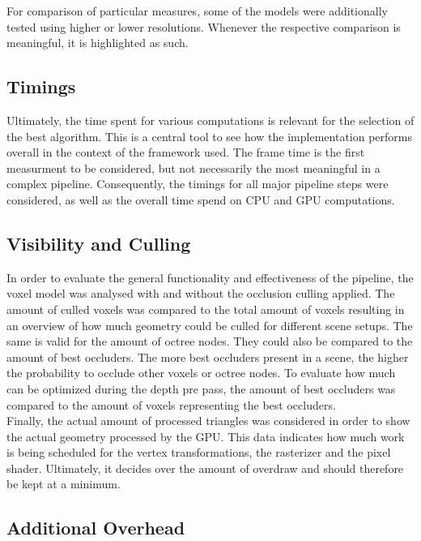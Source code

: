 \noindent
For comparison of particular measures, some of the models were additionally tested using higher or lower resolutions.
Whenever the respective comparison is meaningful, it is highlighted as such.


\subsection*{Timings} \label{subsec-timings}

Ultimately, the time spent for various computations is relevant for the selection of the best algorithm. This is 
a central tool to see how the implementation performs overall in the context of the framework used. The frame 
time is the first measurment to be considered, but not necessarily the most meaningful in a complex pipeline. 
Consequently, the timings for all major pipeline steps were considered, as well as the overall time spend on 
\ac{CPU} and \ac{GPU} computations. 


\subsection*{Visibility and Culling} \label{subsec-visibility-and-culling}

In order to evaluate the general functionality and effectiveness of the pipeline, the voxel model was analysed 
with and without the occlusion culling applied. The amount of culled voxels was compared to the total amount of 
voxels resulting in an overview of how much geometry could be culled for different scene setups. The same is 
valid for the amount of octree nodes. They could also be compared to the amount of best occluders. The more best 
occluders present in a scene, the higher the probability to occlude other voxels or octree nodes. To evaluate 
how much can be optimized during the depth pre pass, the amount of best occluders was compared to the amount 
of voxels representing the best occluders. \\

\noindent
Finally, the actual amount of processed triangles was considered in order to show the actual geometry processed 
by the \ac{GPU}. This data indicates how much work is being scheduled for the vertex transformations, the rasterizer 
and the pixel shader. Ultimately, it decides over the amount of overdraw and should therefore be kept at a minimum.


\subsection*{Additional Overhead} \label{subsec-additional-overhead}

